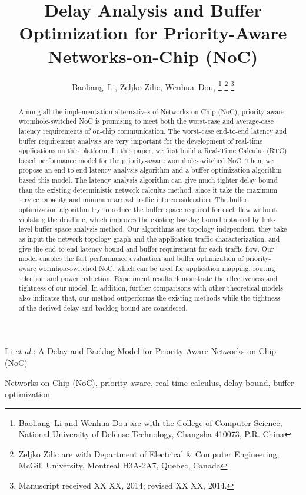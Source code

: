 \documentclass[10pt,journal]{IEEEtran}
\begin{document}
\title{Delay Analysis and Buffer Optimization for Priority-Aware Networks-on-Chip (NoC)}

\author{Baoliang~Li, %
        Zeljko Zilic, %
        Wenhua~Dou, %
\thanks{Baoliang~Li and Wenhua Dou are with the College of Computer Science, National University of Defense Technology, Changsha 410073, P.R. China}%
\thanks{Zeljko Zilic are with Department of Electrical \& Computer Engineering, McGill University, Montreal H3A-2A7, Quebec, Canada}%
\thanks{Manuscript received XX XX, 2014; revised XX XX, 2014.}}

%
{Li \MakeLowercase{\textit{et al.}}: A Delay and Backlog Model for Priority-Aware Networks-on-Chip (NoC)}

\maketitle

\begin{abstract}
Among all the implementation alternatives of Networks-on-Chip (NoC), priority-aware wormhole-switched NoC is promising to meet both the worst-case and average-case latency requirements of on-chip communication. The worst-case end-to-end latency and buffer requirement analysis are very important for the development of real-time applications on this platform. In this paper, we first build a Real-Time Calculus (RTC) based performance model for the priority-aware wormhole-switched NoC. Then, we propose an end-to-end latency analysis algorithm and a buffer optimization algorithm based this model. The latency analysis algorithm can give much tighter delay bound than the existing deterministic network calculus method, since it take the maximum service capacity and minimum arrival traffic into consideration. The buffer optimization algorithm try to reduce the buffer space required for each flow without violating the deadline, which improves the existing backlog bound obtained by link-level buffer-space analysis method. Our algorithms are topology-independent, they take as input the network topology graph and the application traffic characterization, and give the end-to-end latency bound and buffer requirement for each traffic flow. Our model enables the fast performance evaluation and buffer optimization of priority-aware wormhole-switched NoC, which can be used for application mapping, routing selection and power reduction. Experiment results demonstrate the effectiveness and tightness of our model. In addition, further comparisons with other theoretical models also indicates that, our method outperforms the existing methods while the tightness of the derived delay and backlog bound are considered.
\end{abstract}
\begin{IEEEkeywords}
Networks-on-Chip (NoC), priority-aware, real-time calculus, delay bound, buffer optimization
\end{IEEEkeywords}
\end{document}
